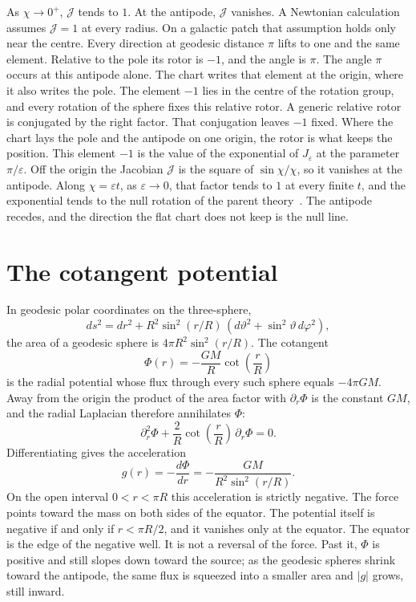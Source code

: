 \documentclass[a4paper]{article}
\begin{document}
As $\chi \to 0^+$, $\mathcal{J}$ tends to $1$. At the antipode, $\mathcal{J}$ vanishes. A Newtonian calculation assumes $\mathcal{J}=1$ at every radius. On a galactic patch that assumption holds only near the centre. Every direction at geodesic distance $\pi$ lifts to one and the same element. Relative to the pole its rotor is $-1$, and the angle is $\pi$. The angle $\pi$ occurs at this antipode alone. The chart writes that element at the origin, where it also writes the pole. The element $-1$ lies in the centre of the rotation group, and every rotation of the sphere fixes this relative rotor. A generic relative rotor is conjugated by the right factor. That conjugation leaves $-1$ fixed. Where the chart lays the pole and the antipode on one origin, the rotor is what keeps the position. This element $-1$ is the value of the exponential of $J_\varepsilon$ at the parameter $\pi/\varepsilon$. Off the origin the Jacobian $\mathcal{J}$ is the square of $\sin\chi/\chi$, so it vanishes at the antipode. Along $\chi=\varepsilon t$, as $\varepsilon\to 0$, that factor tends to $1$ at every finite $t$, and the exponential tends to the null rotation of the parent theory~\cite{dst-main}. The antipode recedes, and the direction the flat chart does not keep is the null line.

\section{The cotangent potential}
\label{sec:cotangent}

In geodesic polar coordinates on the three-sphere,
\[
ds^2 = dr^2 + R^2 \sin^2(r/R)\,(d\vartheta^2 + \sin^2\!\vartheta\, d\varphi^2),
\]
the area of a geodesic sphere is $4\pi R^2\sin^2(r/R)$. The cotangent
\[
\Phi(r) = -\frac{GM}{R}\cot\!\left(\frac{r}{R}\right)
\]
is the radial potential whose flux through every such sphere equals $-4\pi GM$. Away from the origin the product of the area factor with $\partial_r\Phi$ is the constant $GM$, and the radial Laplacian therefore annihilates $\Phi$:
\[
\partial_r^2\Phi + \frac{2}{R}\cot\!\left(\frac{r}{R}\right)\,\partial_r\Phi = 0.
\]
Differentiating gives the acceleration
\[
g(r) = -\frac{d\Phi}{dr} = -\frac{GM}{R^2\sin^2(r/R)}.
\]
On the open interval $0<r<\pi R$ this acceleration is strictly negative. The force points toward the mass on both sides of the equator. The potential itself is negative if and only if $r<\pi R/2$, and it vanishes only at the equator. The equator is the edge of the negative well. It is not a reversal of the force. Past it, $\Phi$ is positive and still slopes down toward the source; as the geodesic spheres shrink toward the antipode, the same flux is squeezed into a smaller area and $|g|$ grows, still inward.
\end{document}
